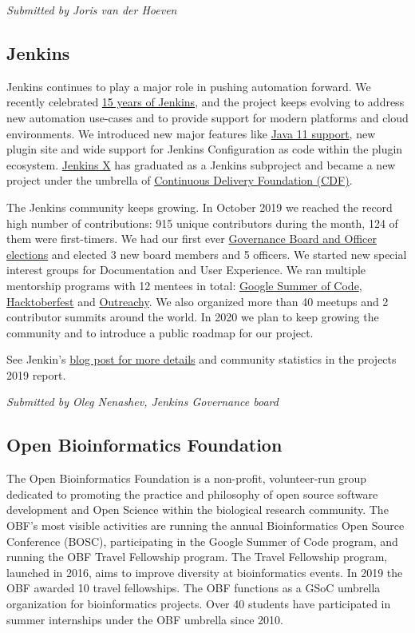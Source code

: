 \documentclass[a4paper]{report}
\begin{document}
{\em Submitted by Joris van der Hoeven}

\subsection{Jenkins}

Jenkins continues to play a major role in pushing automation forward. We
recently celebrated
\href{https://cd.foundation/announcement/2019/08/14/jenkins-celebrates-15-years/}{15
years of Jenkins}, and the project keeps evolving to address new
automation use-cases and to provide support for modern platforms and
cloud environments. We introduced new major features like
\href{https://jenkins.io/blog/2019/03/11/let-s-celebrate-java-11-support/}{Java
11 support}, new plugin site and wide support for Jenkins Configuration
as code within the plugin ecosystem.
\href{https://jenkins-x.io/}{Jenkins X} has graduated as a Jenkins
subproject and became a new project under the umbrella of
\href{https://cd.foundation/}{Continuous Delivery Foundation (CDF)}.

The Jenkins community keeps growing. In October 2019 we reached the
record high number of contributions: 915 unique contributors during the
month, 124 of them were first-timers. We had our first ever
\href{https://jenkins.io/blog/2019/12/16/board-election-results/}{Governance
Board and Officer elections} and elected 3 new board members and 5
officers. We started new special interest groups for Documentation and
User Experience. We ran multiple mentorship programs with 12 mentees in
total: \href{https://jenkins.io/projects/gsoc/2019/}{Google Summer of
Code}, \href{https://jenkins.io/events/hacktoberfest/}{Hacktoberfest}
and
\href{https://jenkins.io/blog/2019/09/23/outreachy-audit-log-release/}{Outreachy}.
We also organized more than 40 meetups and 2 contributor summits around
the world. In 2020 we plan to keep growing the community and to
introduce a public roadmap for our project.

See Jenkin's
\href{https://jenkins.io/blog/2020/01/07/happy-new-year/}{blog post for
more details} and community statistics in the projects 2019 report.

{\em Submitted by Oleg Nenashev, Jenkins Governance board}

\subsection{Open Bioinformatics Foundation}

The Open Bioinformatics Foundation is a non-profit, volunteer-run group
dedicated to promoting the practice and philosophy of open source
software development and Open Science within the biological research
community. The OBF’s most visible activities are running the annual
Bioinformatics Open Source Conference (BOSC), participating in the
Google Summer of Code program, and running the OBF Travel Fellowship
program. The Travel Fellowship program, launched in 2016, aims to
improve diversity at bioinformatics events. In 2019 the OBF awarded 10
travel fellowships. The OBF functions as a GSoC umbrella organization
for bioinformatics projects.  Over 40 students have participated in
summer internships under the OBF umbrella since 2010.
\end{document}
